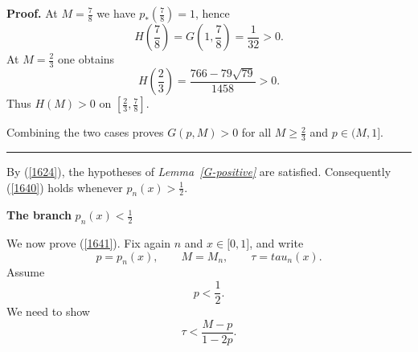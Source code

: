 \documentclass[onecolumn]{article}
\newenvironment{proof}[1][Proof]{\noindent\textbf{#1.} }{\ \rule{0.5em}{0.5em}}
\begin{document}
\begin{proof}
At $M=\frac{7}{8}$ we have $p_{\ast }(\frac{7}{8})=1$, hence 
\begin{equation}
H\!\left( \frac{7}{8}\right) =G\!\left( 1,\frac{7}{8}\right) =\frac{1}{32}>0.
\label{1668}
\end{equation}%
At $M=\frac{2}{3}$ one obtains 
\begin{equation}
H\!\left( \frac{2}{3}\right) =\frac{766-79\sqrt{79}}{1458}>0.  \label{1669}
\end{equation}%
Thus $H(M)>0$ on $[\frac{2}{3},\frac{7}{8}]$.

Combining the two cases proves $G(p,M)>0$ for all $M\geq \frac{2}{3}$ and $%
p\in (M,1]$. \hfill
\end{proof}

By (\ref{1624}), the hypotheses of \textit{Lemma~\ref{G-positive}} are
satisfied. Consequently (\ref{1640}) holds whenever $p_{n}(x)>\frac{1}{2}$.

\begin{flushleft}
\textbf{The branch }$p_{n}(x)<\frac{1}{2}$
\end{flushleft}

We now prove (\ref{1641}). Fix again $n$ and $x\in \lbrack 0,1]$, and write 
\begin{equation}
p=p_{n}(x),\qquad M=M_{n},\qquad \tau =tau_{n}(x).  \label{1670}
\end{equation}%
Assume 
\begin{equation}
p<\frac{1}{2}.  \label{1671}
\end{equation}%
We need to show 
\begin{equation}
\tau <\frac{M-p}{1-2p}.  \label{1672}
\end{equation}
\end{document}
